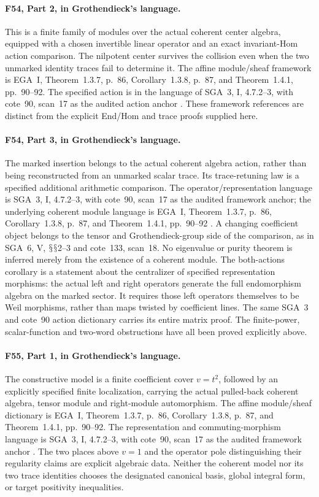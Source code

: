 \documentclass[11pt,a4paper]{article}
\renewcommand{\S}{\ensuremath{\mathsection}}
\newcommand{\fid}[1]{\textsf{#1}}\newcommand{\gate}[1]{\textsf{#1}}
\theoremstyle{named}\newtheorem{finding}{Finding}[section]
\theoremstyle{definition}\newtheorem{definition}[finding]{Definition}
\theoremstyle{remark}\newtheorem{remark}[finding]{Remark}
\begin{document}
\paragraph{\fid{F54}, Part 2, in Grothendieck's language.}
This is a finite family of modules over the actual
coherent center algebra, equipped with a chosen invertible
linear operator and an exact invariant-Hom action comparison.
The nilpotent center survives the collision even when
the two unmarked identity traces fail to determine it.
The affine module/sheaf framework is EGA~I,
Theorem~1.3.7, p.~86, Corollary~1.3.8, p.~87, and
Theorem~1.4.1, pp.~90--92.
The specified action is in the language of SGA~3, I,
4.7.2--3, with cote~90, scan~17 as the audited action
anchor \cite{EGA,SGA3,Archive}.
These framework references are distinct from the
explicit End/Hom and trace proofs supplied here.

\paragraph{\fid{F54}, Part 3, in Grothendieck's language.}
The marked insertion belongs to the actual coherent
algebra action, rather than being reconstructed from an
unmarked scalar trace.
Its trace-retuning law is a specified additional
arithmetic comparison.
The operator/representation language is SGA~3, I,
4.7.2--3, with cote~90, scan~17 as the audited framework
anchor; the underlying coherent module language is
EGA~I, Theorem~1.3.7, p.~86, Corollary~1.3.8, p.~87,
and Theorem~1.4.1, pp.~90--92
\cite{SGA3,EGA,Archive}.
A changing coefficient object belongs to the tensor
and Grothendieck-group side of the comparison, as in
SGA~6, V, \S\S2--3 and cote~133, scan~18.
No eigenvalue or purity theorem is inferred merely
from the existence of a coherent module.
The both-actions corollary is a statement about the centralizer of specified representation morphisms: the actual left and right operators generate the full endomorphism algebra on the marked sector. It requires those left operators themselves to be Weil morphisms, rather than maps twisted by coefficient lines. The same SGA~3 and cote~90 action dictionary carries its entire matrix proof.
The finite-power, scalar-function and two-word
obstructions have all been proved explicitly above.

\paragraph{\fid{F55}, Part 1, in Grothendieck's language.}
The constructive model is a finite coefficient cover $v=t^2$, followed by an explicitly specified finite localization, carrying the actual pulled-back coherent algebra, tensor module and right-module automorphism.
The affine module/sheaf dictionary is EGA~I, Theorem~1.3.7, p.~86, Corollary~1.3.8, p.~87, and Theorem~1.4.1, pp.~90--92.
The representation and commuting-morphism language is SGA~3, I, 4.7.2--3, with cote~90, scan~17 as the audited framework anchor \cite{EGA,SGA3,Archive}.
The two places above $v=1$ and the operator pole distinguishing their regularity claims are explicit algebraic data.
Neither the coherent model nor its two trace identities chooses the designated canonical basis, global integral form, or target positivity inequalities.
\end{document}
